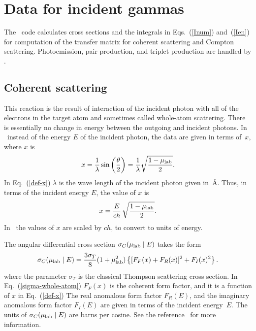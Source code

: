 \chapter{Data for incident gammas}
\label{Sec:gamma-in}

The \gettransfer\ code calculates cross sections and the integrals in
Eqs.~(\ref{Inum}) and~(\ref{Ien}) for computation of the transfer matrix
for  coherent scattering and
Compton scattering. Photoemission, pair production, and
triplet production are handled by \xndfgen.

\section{Coherent scattering}
This reaction is the result of interaction of the incident photon with all
of the electrons in the target atom and sometimes called whole-atom scattering.
There
is essentially no change in energy between the outgoing and incident
photons.  In \xendl\ instead of the energy $E$ of the incident photon, 
the data are given in terms of~$x$,
where $x$ is
\begin{equation}
  x = 
  \frac{1}{\lambda}\sin \left(
     \frac{\theta}{2} \right) =  
  \frac{1}{\lambda}
  \sqrt{\frac{1-\mu_{\text{lab}}}{2}}.
  \label{def-x}
\end{equation}
In Eq.~(\ref{def-x}) $\lambda$ is the wave length of the
incident photon given in~\AA.  Thus, in terms of the incident energy $E$, the
value of $x$ is
\begin{equation}
  x = \frac{E}{ch}\,
  \sqrt{\frac{1-\mu_{\text{lab}}}{2}}
  \label{def-x-MeV}.
\end{equation}
In \gettransfer\ the values of $x$ are scaled by $ch$,
to convert to units of energy.

The angular differential cross
section $\sigma_C(\mu_{\text{lab}} \mid E)$ takes the form
\begin{equation}
  \sigma_C(\mu_{\text{lab}} \mid E) =
    \frac{3\sigma_T}{8} (1 + \mu_{\text{lab}}^2 )
    \left \{
       [ F_F(x) + F_R(x)  ]^2 + F_I(x)^2
    \right \}.
  \label{sigma-whole-atom}
\end{equation}
where the parameter $\sigma_T$ is the classical
Thompson scattering cross section.
In Eq.~(\ref{sigma-whole-atom}) 
$F_F(x)$ is the coherent form factor, and it is a function of
$x$ in Eq.~(\ref{def-x})
The real
anomalous form factor $F_R(E)$, and the imaginary
anomalous form factor $F_I(E)$ are given in terms of
the incident energy~$E$.
The units of $\sigma_C(\mu_{\text{lab}} \mid E)$ are barns per cosine.
See the reference~\cite{ENDFB} for more information.

